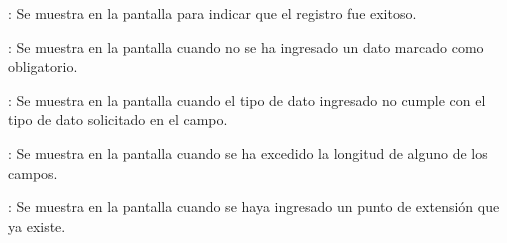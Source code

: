 \begin{Citemize}
	\item {}: Se muestra en la pantalla  para indicar que el registro fue exitoso.
	\item {}: Se muestra en la pantalla  cuando no se ha ingresado un dato marcado como obligatorio.
	\item {}: Se muestra en la pantalla  cuando el tipo de dato ingresado no cumple con el tipo de dato solicitado en el campo.
	\item {}: Se muestra en la pantalla  cuando se ha excedido la longitud de alguno de los campos.
	\item {}: Se muestra en la pantalla  cuando se haya ingresado un punto de extensión que ya existe.
\end{Citemize}
